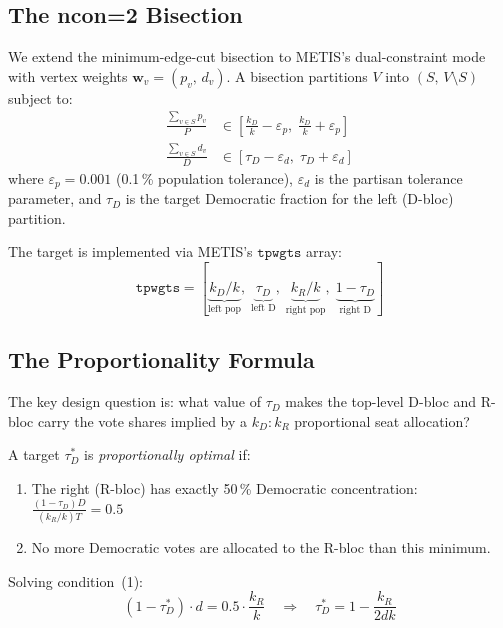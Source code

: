 \subsection{The ncon=2 Bisection}

We extend the minimum-edge-cut bisection to METIS's dual-constraint mode with
vertex weights $\mathbf{w}_v = (p_v,\, d_v)$.
A bisection partitions $V$ into $(S,\, V \setminus S)$ subject to:
\begin{align}
  \frac{\sum_{v \in S} p_v}{P} &\in \left[\frac{k_D}{k} - \varepsilon_p,\; \frac{k_D}{k} + \varepsilon_p\right] \label{eq:pop-balance}\\
  \frac{\sum_{v \in S} d_v}{D} &\in \left[\tau_D - \varepsilon_d,\; \tau_D + \varepsilon_d\right] \label{eq:dem-balance}
\end{align}
where $\varepsilon_p = 0.001$ (0.1\,\% population tolerance), $\varepsilon_d$ is
the partisan tolerance parameter, and $\tau_D$ is the target Democratic fraction
for the left (D-bloc) partition.

The target is implemented via METIS's $\mathtt{tpwgts}$ array:
\[
  \mathtt{tpwgts} = [\underbrace{k_D/k}_{\text{left pop}},\; \underbrace{\tau_D}_{\text{left D}},\;
                     \underbrace{k_R/k}_{\text{right pop}},\; \underbrace{1-\tau_D}_{\text{right D}}]
\]

\subsection{The Proportionality Formula}
\label{sec:formula}

The key design question is: what value of $\tau_D$ makes the top-level D-bloc
and R-bloc carry the vote shares implied by a $k_D:k_R$ proportional seat
allocation?

\begin{definition}
A target $\tau_D^*$ is \emph{proportionally optimal} if:
\begin{enumerate}
  \item The right (R-bloc) has exactly 50\,\% Democratic concentration:
    $\frac{(1-\tau_D) D}{(k_R/k) T} = 0.5$
  \item No more Democratic votes are allocated to the R-bloc than this minimum.
\end{enumerate}
\end{definition}

Solving condition~(1):
\[
  (1 - \tau_D^*) \cdot d = 0.5 \cdot \frac{k_R}{k}
  \quad \Longrightarrow \quad
  \tau_D^* = 1 - \frac{k_R}{2dk}
\]

